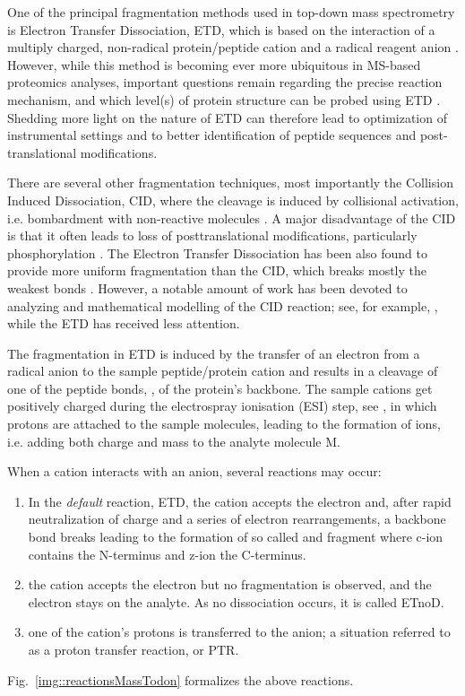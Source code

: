 \documentclass{llncs}
\begin{document}
        One of the principal fragmentation methods used in top-down mass spectrometry is Electron Transfer Dissociation, ETD, which is based on the interaction of a multiply charged, non-radical protein/peptide cation and a radical reagent anion \cite{Syka2004-rg,Zhurov2013-ua}. However, while this method is becoming ever more ubiquitous in MS-based proteomics analyses, important questions remain regarding the precise reaction mechanism, and which level(s) of protein structure can be probed using ETD \cite{Sohn2009-zv,Sohn2015-rp}. Shedding more light on the nature of ETD can therefore lead to optimization of instrumental settings and to better identification of peptide sequences and post-translational modifications.

        There are several other fragmentation techniques, most importantly the Collision Induced Dissociation, CID, where the cleavage is induced by collisional activation, i.e. bombardment with non-reactive molecules \cite{Mitchell_Wells2005-gn}. A major disadvantage of the CID is that it often leads to loss of posttranslational modifications, particularly phosphorylation \cite{Kim2012-yz}. The Electron Transfer Dissociation has been also found to provide more uniform fragmentation than the CID, which breaks mostly the weakest bonds \cite{Kim2012-yz,Zhurov2013-ua}. However, a notable amount of work has been devoted to analyzing and mathematical modelling of the CID reaction; see, for example, \cite{Zhang2004-fp,Zhang2005-jn,Wysocki2000-am}, while the ETD has received less attention.

        The fragmentation in ETD is induced by the transfer of an electron from a radical anion to the sample peptide/protein cation and results in a cleavage of one of the peptide bonds, , of the protein’s backbone. The sample cations get positively charged during the electrospray ionisation (ESI) step, see \cite{Fenn1989-mp}, in which protons are attached to the sample molecules, leading to the formation of  ions, i.e. adding both charge and mass to the analyte molecule M.

        When a cation interacts with an anion, several reactions may occur:

        \begin{enumerate}
                \item In the \textit{default} reaction, ETD, the cation accepts the electron and, after rapid neutralization of charge and a series of electron rearrangements, a backbone  bond breaks leading to the formation of so called  and  fragment where c-ion contains the N-terminus and z-ion the C-terminus.

                \item the cation accepts the electron but no fragmentation is observed, and the electron stays on the analyte. As no dissociation occurs, it is called ETnoD.

                \item one of the cation’s protons is transferred to the anion; a situation referred to as a proton transfer reaction, or PTR.
        \end{enumerate}
        Fig.~\ref{img::reactionsMassTodon} formalizes the above reactions.
\end{document}
